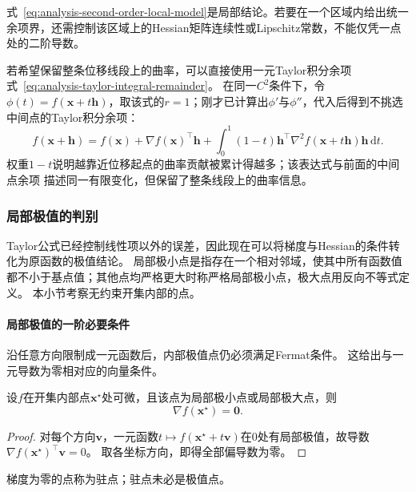 式~\eqref{eq:analysis-second-order-local-model}是局部结论。若要在一个区域内给出统一余项界，还需控制该区域上的Hessian矩阵连续性或Lipschitz常数，不能仅凭一点处的二阶导数。

若希望保留整条位移线段上的曲率，可以直接使用一元Taylor积分余项式~\eqref{eq:analysis-taylor-integral-remainder}。
在同一$C^2$条件下，令$\phi(t)=f(\bm x+t\bm h)$，取该式的$r=1$；刚才已计算出$\phi'$与$\phi''$，代入后得到不挑选中间点的Taylor积分余项：
\[   f(\bm{x}+\bm{h})   =   f(\bm{x})   +\nabla f(\bm{x})^{\top}\bm{h}   +   \int_0^1(1-t)   \bm{h}^{\top}\nabla^2f(\bm{x}+t\bm{h})\bm{h}\,\mathrm{d}t. \]
权重$1-t$说明越靠近位移起点的曲率贡献被累计得越多；该表达式与前面的中间点余项
描述同一有限变化，但保留了整条线段上的曲率信息。

\subsubsection{局部极值的判别}

Taylor公式已经控制线性项以外的误差，因此现在可以将梯度与Hessian的条件转化为原函数的极值结论。
局部极小点是指存在一个相对邻域，使其中所有函数值都不小于基点值；其他点均严格更大时称严格局部极小点，极大点用反向不等式定义。
本小节考察无约束开集内部的点。

\paragraph{局部极值的一阶必要条件}
沿任意方向限制成一元函数后，内部极值点仍必须满足Fermat条件。
这给出与一元导数为零相对应的向量条件。
\begin{theorem}[局部极值的一阶必要条件]
\label{thm:multivariable-extremum-first-order}
设$f$在开集内部点$\bm x^\star$处可微，且该点为局部极小点或局部极大点，则
\begin{equation}
 \nabla f(\bm x^\star)=\bm0.
\label{eq:analysis-first-order-necessary}
\end{equation}
\end{theorem}
\begin{proof}
对每个方向$\bm v$，一元函数$t\mapsto f(\bm x^\star+t\bm v)$在$0$处有局部极值，故导数$\nabla f(\bm x^\star)^\top\bm v=0$。
取各坐标方向，即得全部偏导数为零。
\end{proof}
梯度为零的点称为驻点；驻点未必是极值点。

